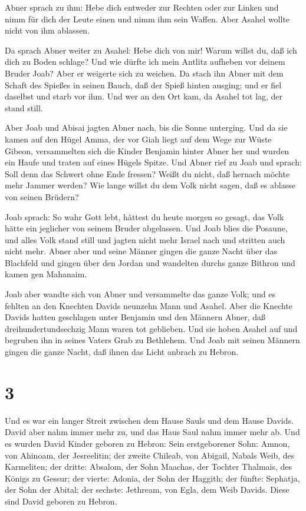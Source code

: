  Abner sprach zu ihm: Hebe dich entweder zur Rechten oder
zur Linken und nimm für dich der Leute einen und nimm ihm sein Waffen.
Aber Asahel wollte nicht von ihm ablassen.

 Da sprach Abner weiter zu Asahel: Hebe dich von mir! Warum
willst du, daß ich dich zu Boden schlage? Und wie dürfte ich mein
Antlitz aufheben vor deinem Bruder Joab?  Aber er weigerte
sich zu weichen. Da stach ihn Abner mit dem Schaft des Spießes in seinen
Bauch, daß der Spieß hinten ausging; und er fiel daselbst und starb vor
ihm. Und wer an den Ort kam, da Asahel tot lag, der stand still.

 Aber Joab und Abisai jagten Abner nach, bis die Sonne
unterging. Und da sie kamen auf den Hügel Amma, der vor Giah liegt auf
dem Wege zur Wüste Gibeon,  versammelten sich die Kinder
Benjamin hinter Abner her und wurden ein Haufe und traten auf eines
Hügels Spitze.  Und Abner rief zu Joab und sprach: Soll
denn das Schwert ohne Ende fressen? Weißt du nicht, daß hernach möchte
mehr Jammer werden? Wie lange willst du dem Volk nicht sagen, daß es
ablasse von seinen Brüdern?

 Joab sprach: So wahr Gott lebt, hättest du heute morgen so
gesagt, das Volk hätte ein jeglicher von seinem Bruder abgelassen.
 Und Joab blies die Posaune, und alles Volk stand still und
jagten nicht mehr Israel nach und stritten auch nicht mehr.
 Abner aber und seine Männer gingen die ganze Nacht über
das Blachfeld und gingen über den Jordan und wandelten durchs ganze
Bithron und kamen gen Mahanaim.

 Joab aber wandte sich von Abner und versammelte das ganze
Volk; und es fehlten an den Knechten Davids neunzehn Mann und Asahel.
 Aber die Knechte Davids hatten geschlagen unter Benjamin
und den Männern Abner, daß dreihundertundsechzig Mann waren tot
geblieben.  Und sie hoben Asahel auf und begruben ihn in
seines Vaters Grab zu Bethlehem. Und Joab mit seinen Männern gingen die
ganze Nacht, daß ihnen das Licht anbrach zu Hebron.

\hypertarget{section-2}{%
\section{3}\label{section-2}}

 Und es war ein langer Streit zwischen dem Hause Sauls und
dem Hause Davids. David aber nahm immer mehr zu, und das Haus Saul nahm
immer mehr ab.  Und es wurden David Kinder geboren zu
Hebron: Sein erstgeborener Sohn: Amnon, von Ahinoam, der Jesreelitin;
 der zweite Chileab, von Abigail, Nabals Weib, des
Karmeliten; der dritte: Absalom, der Sohn Maachas, der Tochter Thalmais,
des Königs zu Gessur;  der vierte: Adonia, der Sohn der
Haggith; der fünfte: Sephatja, der Sohn der Abital;  der
sechste: Jethream, von Egla, dem Weib Davids. Diese sind David geboren
zu Hebron.

